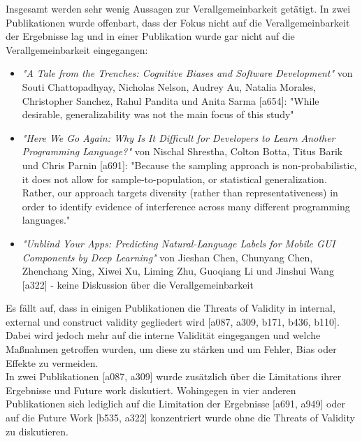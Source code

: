 Insgesamt werden sehr wenig Aussagen zur Verallgemeinbarkeit getätigt. In zwei Publikationen wurde offenbart, dass der Fokus nicht auf die Verallgemeinbarkeit der Ergebnisse lag und in einer Publikation wurde gar nicht auf die Verallgemeinbarkeit eingegangen:
\begin{itemize}
    \item \textit{"A Tale from the Trenches: Cognitive Biases and Software Development"} von Souti Chattopadhyay, Nicholas Nelson, Audrey Au, Natalia Morales, Christopher Sanchez, Rahul Pandita und Anita Sarma [a654]: "While desirable, generalizability was not the main focus of this study"
    \item \textit{"Here We Go Again: Why Is It Difficult for Developers to Learn Another Programming Language?"} von Nischal Shrestha, Colton Botta, Titus Barik und Chris Parnin [a691]: "Because the sampling approach is non-probabilistic, it does not allow for sample-to-population, or statistical generalization. Rather, our approach targets diversity (rather than representativeness) in order to identify evidence of interference across many different programming languages."
    \item \textit{"Unblind Your Apps: Predicting Natural-Language Labels for Mobile GUI Components by Deep Learning"} von Jieshan Chen, Chunyang Chen, Zhenchang Xing, Xiwei Xu, Liming Zhu, Guoqiang Li und Jinshui Wang [a322] - keine Diskussion über die Verallgemeinbarkeit
\end{itemize}

Es fällt auf, dass in einigen Publikationen die Threats of Validity in internal, external und construct validity gegliedert wird [a087, a309, b171, b436, b110]. Dabei wird jedoch mehr auf die interne Validität eingegangen und welche Maßnahmen getroffen wurden, um diese zu stärken und um Fehler, Bias oder Effekte zu vermeiden. \\
In zwei Publikationen [a087, a309] wurde zusätzlich über die Limitations ihrer Ergebnisse und Future work diskutiert. 
Wohingegen in vier anderen Publikationen sich lediglich auf die Limitation der Ergebnisse [a691, a949] oder auf die Future Work [b535, a322] konzentriert wurde ohne die Threats of Validity zu diskutieren.



